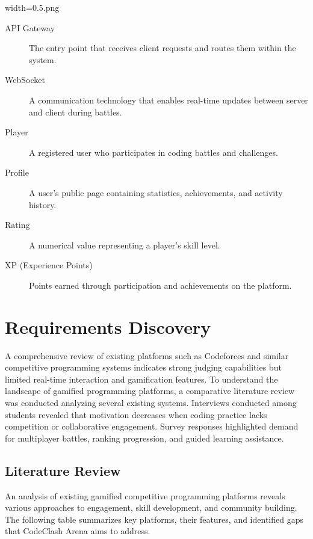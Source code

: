 width=0.5\linewidthimage.png\documentclass[12pt,a4paper]{article}
\begin{document}
\begin{description}
\item[API Gateway] The entry point that receives client requests and routes them within the system.

\item[WebSocket] A communication technology that enables real-time updates between server and client during battles.

\item[Player] A registered user who participates in coding battles and challenges.

\item[Profile] A user's public page containing statistics, achievements, and activity history.

\item[Rating] A numerical value representing a player's skill level.

\item[XP (Experience Points)] Points earned through participation and achievements on the platform.
\end{description}

\section{Requirements Discovery}

A comprehensive review of existing platforms such as Codeforces and similar competitive programming systems indicates strong judging capabilities but limited real-time interaction and gamification features. To understand the landscape of gamified programming platforms, a comparative literature review was conducted analyzing several existing systems. Interviews conducted among students revealed that motivation decreases when coding practice lacks competition or collaborative engagement. Survey responses highlighted demand for multiplayer battles, ranking progression, and guided learning assistance.

\subsection{Literature Review}

An analysis of existing gamified competitive programming platforms reveals various approaches to engagement, skill development, and community building. The following table summarizes key platforms, their features, and identified gaps that CodeClash Arena aims to address.
\end{document}
